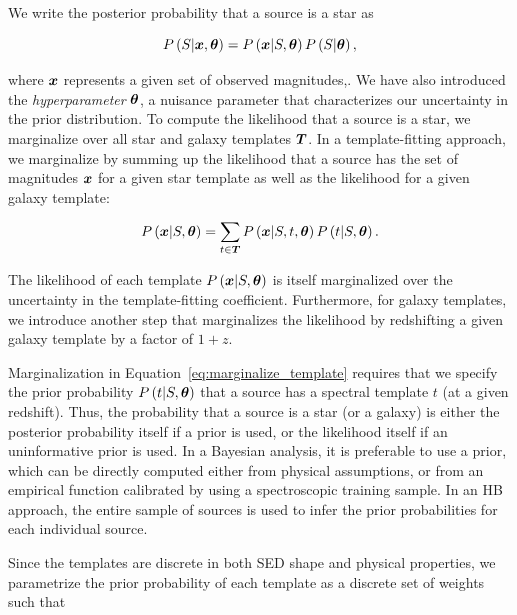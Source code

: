 \documentclass[useAMS,usenatbib]{mn2e}
\begin{document}
We write the posterior probability that a source is a star as

\begin{equation} \label{eq:overall_posterior}
P \left( S | \bmath{x}, \bmath{\theta} \right)
= P \left( \bmath{x} | S, \bmath{\theta} \right)
P \left( S | \bmath{\theta} \right),
\end{equation}

\noindent
where $\bmath{x}$ represents a given set of observed magnitudes,.
We have also introduced the \textit{hyperparameter} $\bmath{\theta}$,
a nuisance parameter that characterizes our uncertainty
in the prior distribution.
To compute the likelihood that a source is a star,
we marginalize over all star and galaxy templates $\bmath{T}$.
In a template-fitting approach,
we marginalize by summing up
the likelihood that a source has the set of magnitudes $\bmath{x}$
for a given star template
as well as the likelihood for a given galaxy template:

\begin{equation} \label{eq:marginalize_template}
  P \left(\bmath{x} | S, \bmath{\theta} \right)
  = \sum_{t \in \bmath{T}}
  P \left(\bmath{x} | S, t, \bmath{\theta} \right)
  P \left(t | S, \bmath{\theta} \right).
\end{equation}

\noindent
The likelihood of each template
$P \left( \bmath{x} | S, \bmath{\theta} \right)$
is itself marginalized over the uncertainty
in the template-fitting coefficient.
Furthermore, for galaxy templates, we introduce another step that 
marginalizes the likelihood by redshifting a given galaxy template
by a factor of $1 + z$.

Marginalization in Equation~\ref{eq:marginalize_template}
requires that we specify the prior probability
$P \left(t | S, \bmath{\theta} \right)$
that a source has a spectral template $t$ (at a given redshift).
Thus, the probability that a source is a star (or a galaxy)
is either the posterior probability itself
if a prior is used,
or the likelihood itself if an uninformative prior is used.
In a Bayesian analysis, it is preferable to use a prior,
which can be directly computed either from physical assumptions,
or from an empirical function calibrated by
using a spectroscopic training sample.
In an HB approach, the entire sample of sources is used to
infer the prior probabilities for each individual source.

Since the templates are discrete in both SED shape and physical properties,
we parametrize the prior probability of each template
as a discrete set of weights such that
\end{document}
